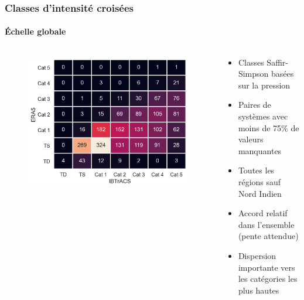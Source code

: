 \documentclass[aspectratio=169, usepdftitle=false, xcolor={dvipsnames}, 9pt,table]{beamer}
\begin{document}
\begin{frame}[t]
    \frametitle{Classes d'intensité croisées}
    \framesubtitle{Échelle globale}
    \begin{columns}
        \begin{column}{0.5\textwidth}
            \vspace{1em}
            \begin{figure}
                \centering
                \includegraphics[width=\textwidth]{Figures/crosstable_global_myVTU.png}
            \end{figure}
        \end{column}
        \begin{column}{0.5\textwidth}
            \footnotesize
            \setlength{\leftmargini}{3.5ex}
            \begin{examples}[Méthodologie]
                \begin{itemize}
                    \item Classes Saffir-Simpson basées sur la \alert{pression}\\\parencite{klotzbach_surface_2020}
                    \item Paires de systèmes avec moins de 75\% de valeurs manquantes
                    \item Toutes les régions sauf Nord Indien
                \end{itemize}    
            \end{examples}
            \vspace{2em}
            \begin{block}
               \begin{itemize}
                    \item Accord relatif dans l'ensemble (pente attendue)
                    \item \alert{Dispersion importante} vers les catégories les plus hautes
               \end{itemize} 
            \end{block}
        \end{column}
    \end{columns} 
\end{frame}
\end{document}
